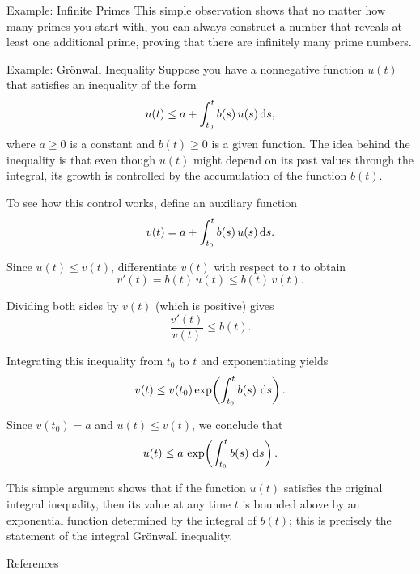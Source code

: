 \documentclass[final]{beamer}
\begin{document}
\begin{frame}[fragile]
\begin{columns}[t]
\begin{column}{0.3\paperwidth}
\begin{exampleblock}{Example: Infinite Primes}
    This simple observation shows that no matter how many primes you start with,
    you can always construct a number that reveals at least one additional prime,
    proving that there are infinitely many prime numbers.
\end{exampleblock}

\begin{exampleblock}{Example: Grönwall Inequality}
    Suppose you have a nonnegative function \(u(t)\) that satisfies an inequality
    of the form
    \[
        u(t) \le a + \int_{t_0}^t b(s)\, u(s) \dx[s],
    \]
    where \(a \ge 0\) is a constant and \(b(t) \ge 0\) is a given function. The
    idea behind the inequality is that even though \(u(t)\) might depend on its
    past values through the integral, its growth is controlled by the accumulation
    of the function \(b(t)\).

    \bigskip
    To see how this control works, define an auxiliary function
    \[
        v(t) = a + \int_{t_0}^t b(s)\, u(s) \dx[s].
    \]

    Since \(u(t) \le v(t)\), differentiate \(v(t)\) with respect to \(t\) to obtain
    \[
        v'(t) = b(t)\, u(t) \le b(t)\, v(t).
    \]

    Dividing both sides by \(v(t)\) (which is positive) gives
    \[
        \frac{v'(t)}{v(t)} \le b(t).
    \]

    Integrating this inequality from \(t_0\) to \(t\) and exponentiating yields
    \[
        v(t) \le v(t_0) \exp\!\left(\int_{t_0}^t b(s)\, \dx[s]\right).
    \]

    Since \(v(t_0)=a\) and \(u(t) \le v(t)\), we conclude that
    \[
        u(t) \le a\, \exp\!\left(\int_{t_0}^t b(s)\, \dx[s]\right).
    \]

    \bigskip

    This simple argument shows that if the function \(u(t)\) satisfies the original
    integral inequality, then its value at any time \(t\) is bounded above by an
    exponential function determined by the integral of \(b(t)\); this is precisely
    the statement of the integral Grönwall inequality.
\end{exampleblock}

\begin{block}{References}
    \nocite{*}
    
    
\end{block}

\end{column}
\separatorcolumn
\end{columns}
\end{frame}
\end{document}
